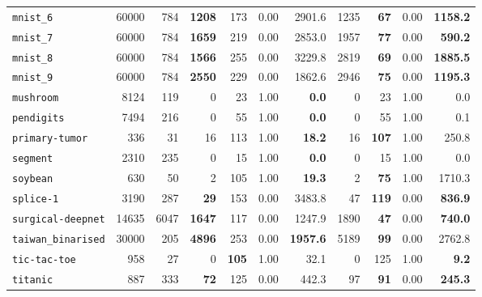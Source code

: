 \begin{tabular}{lccrrrrrrrr}
\texttt{mnist\_6} & \multicolumn{1}{r}{60000} & \multicolumn{1}{r}{784}  & \textbf{1208} & 173 & 0.00 & 2901.6 & 1235 & \textbf{67} & 0.00 & \textbf{1158.2}\\
\texttt{mnist\_7} & \multicolumn{1}{r}{60000} & \multicolumn{1}{r}{784}  & \textbf{1659} & 219 & 0.00 & 2853.0 & 1957 & \textbf{77} & 0.00 & \textbf{590.2}\\
\texttt{mnist\_8} & \multicolumn{1}{r}{60000} & \multicolumn{1}{r}{784}  & \textbf{1566} & 255 & 0.00 & 3229.8 & 2819 & \textbf{69} & 0.00 & \textbf{1885.5}\\
\texttt{mnist\_9} & \multicolumn{1}{r}{60000} & \multicolumn{1}{r}{784}  & \textbf{2550} & 229 & 0.00 & 1862.6 & 2946 & \textbf{75} & 0.00 & \textbf{1195.3}\\
\texttt{mushroom} & \multicolumn{1}{r}{8124} & \multicolumn{1}{r}{119}  & 0 & 23 & 1.00 & \textbf{0.0} & 0 & 23 & 1.00 & 0.0\\
\texttt{pendigits} & \multicolumn{1}{r}{7494} & \multicolumn{1}{r}{216}  & 0 & 55 & 1.00 & \textbf{0.0} & 0 & 55 & 1.00 & 0.1\\
\texttt{primary-tumor} & \multicolumn{1}{r}{336} & \multicolumn{1}{r}{31}  & 16 & 113 & 1.00 & \textbf{18.2} & 16 & \textbf{107} & 1.00 & 250.8\\
\texttt{segment} & \multicolumn{1}{r}{2310} & \multicolumn{1}{r}{235}  & 0 & 15 & 1.00 & \textbf{0.0} & 0 & 15 & 1.00 & 0.0\\
\texttt{soybean} & \multicolumn{1}{r}{630} & \multicolumn{1}{r}{50}  & 2 & 105 & 1.00 & \textbf{19.3} & 2 & \textbf{75} & 1.00 & 1710.3\\
\texttt{splice-1} & \multicolumn{1}{r}{3190} & \multicolumn{1}{r}{287}  & \textbf{29} & 153 & 0.00 & 3483.8 & 47 & \textbf{119} & 0.00 & \textbf{836.9}\\
\texttt{surgical-deepnet} & \multicolumn{1}{r}{14635} & \multicolumn{1}{r}{6047}  & \textbf{1647} & 117 & 0.00 & 1247.9 & 1890 & \textbf{47} & 0.00 & \textbf{740.0}\\
\texttt{taiwan\_binarised} & \multicolumn{1}{r}{30000} & \multicolumn{1}{r}{205}  & \textbf{4896} & 253 & 0.00 & \textbf{1957.6} & 5189 & \textbf{99} & 0.00 & 2762.8\\
\texttt{tic-tac-toe} & \multicolumn{1}{r}{958} & \multicolumn{1}{r}{27}  & 0 & \textbf{105} & 1.00 & 32.1 & 0 & 125 & 1.00 & \textbf{9.2}\\
\texttt{titanic} & \multicolumn{1}{r}{887} & \multicolumn{1}{r}{333}  & \textbf{72} & 125 & 0.00 & 442.3 & 97 & \textbf{91} & 0.00 & \textbf{245.3}\\

\end{tabular}
